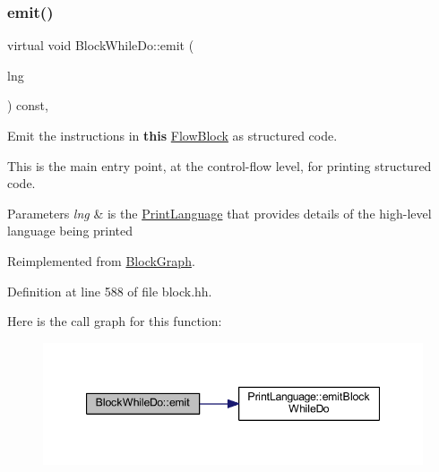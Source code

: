 \subsubsection{\texorpdfstring{emit()}{emit()}}
{\footnotesize\ttfamily virtual void Block\+While\+Do\+::emit (\begin{DoxyParamCaption}\item[{\mbox{\hyperlink{class_print_language}{Print\+Language}} $\ast$}]{lng }\end{DoxyParamCaption}) const\hspace{0.3cm}{\ttfamily [inline]}, {\ttfamily [virtual]}}



Emit the instructions in {\bfseries{this}} \mbox{\hyperlink{class_flow_block}{Flow\+Block}} as structured code. 

This is the main entry point, at the control-\/flow level, for printing structured code. 
\begin{DoxyParams}{Parameters}
{\em lng} & is the \mbox{\hyperlink{class_print_language}{Print\+Language}} that provides details of the high-\/level language being printed \\
\hline
\end{DoxyParams}


Reimplemented from \mbox{\hyperlink{class_block_graph_a535d3c7cb13e5e45b6e121b024fa339f}{Block\+Graph}}.



Definition at line 588 of file block.\+hh.

Here is the call graph for this function\+:
\nopagebreak
\begin{figure}[H]
\begin{center}
\leavevmode
\includegraphics[width=347pt]{class_block_while_do_a8596786848701d23bc4e4a7fc3730889_cgraph}
\end{center}
\end{figure}
\mbox{\label{class_block_while_do_a7bb1454de32707fac664051525c58d47}} 
